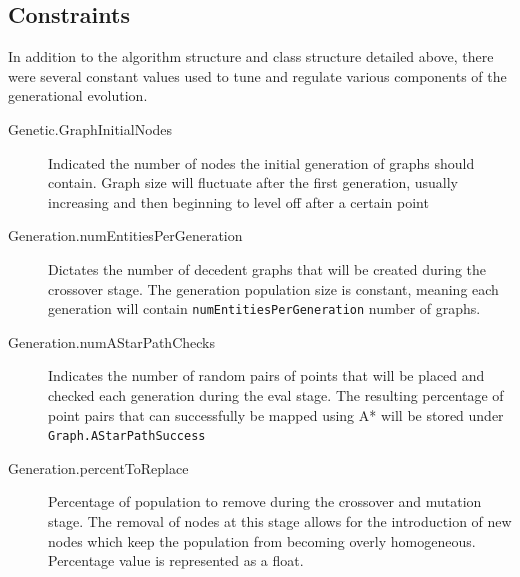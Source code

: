 	\subsection{Constraints}
	In addition to the algorithm structure and class structure detailed above, there were several constant values used to tune and regulate various components of the generational evolution.
	\begin{description}
		\item[Genetic.GraphInitialNodes] Indicated the number of nodes the initial generation of graphs should contain. Graph size will fluctuate after the first generation, usually increasing and then beginning to level off after a certain point
		\item[Generation.numEntitiesPerGeneration] Dictates the number of decedent graphs that will be created during the crossover stage. The generation population size is constant, meaning each generation will contain \texttt{numEntitiesPerGeneration} number of graphs.
		\item[Generation.numAStarPathChecks] Indicates the number of random pairs of points that will be placed and checked each generation during the eval stage. The resulting percentage of point pairs that can successfully be mapped using A* will be stored under \texttt{Graph.AStarPathSuccess}
		\item[Generation.percentToReplace] Percentage of population to remove during the crossover and mutation stage. The removal of nodes at this stage allows for the introduction of new nodes which keep the population from becoming overly homogeneous. Percentage value is represented as a float.
	\end{description}
	
